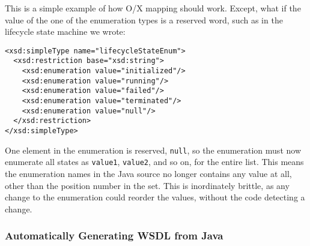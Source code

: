 This is a simple example of how O/X mapping should work. Except, what if the
value of the one of the enumeration types is a reserved word, such as in the
lifecycle state machine we wrote:

\begin{verbatim}
<xsd:simpleType name="lifecycleStateEnum">
  <xsd:restriction base="xsd:string"> 
    <xsd:enumeration value="initialized"/> 
    <xsd:enumeration value="running"/> 
    <xsd:enumeration value="failed"/> 
    <xsd:enumeration value="terminated"/> 
    <xsd:enumeration value="null"/> 
  </xsd:restriction>
</xsd:simpleType>
\end{verbatim}

One element in the enumeration is reserved, \verb|null|, so the
enumeration must now enumerate all states as \verb|value1|,
\verb|value2|, and so on, for the entire list. This means the
enumeration names in the Java source no longer contains any value at
all, other than the position number in the set. This is inordinately
brittle, as any change to the enumeration could reorder the values,
without the code detecting a change.

% 
% 
% 
% 


\subsubsection{Automatically Generating WSDL from Java}
\label{objections:o-x:wsdl-gen}

